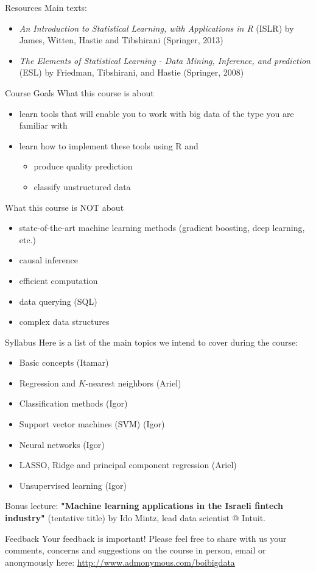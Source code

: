 \documentclass[]{beamer}
\begin{document}
\begin{frame}{Resources}
Main texts:
\begin{itemize}
\item \textit{An Introduction to Statistical Learning, with Applications in R} (ISLR) by James, Witten, Hastie and Tibshirani (Springer, 2013)
\item \textit{The Elements of Statistical Learning - Data Mining, Inference, and prediction} (ESL) by Friedman, Tibshirani, and Hastie (Springer, 2008)
\end{itemize}
\end{frame}

\begin{frame}{Course Goals}
What this course is about
\begin{itemize}
\item learn tools that will enable you to work with big data of the type you are familiar with
\item learn how to implement these tools using R and
\begin{itemize}
\item produce quality prediction
\item classify unstructured data
\end{itemize}
\end{itemize}
What this course is NOT about
\begin{itemize}
\item state-of-the-art machine learning methods (gradient boosting, deep learning, etc.)
\item causal inference
\item efficient computation
\item data querying (SQL)
\item complex data structures
\end{itemize}
\end{frame}

\begin{frame}{Syllabus}
Here is a list of the main topics we intend to cover during the course:
\begin{itemize}
\item Basic concepts (Itamar)
\item Regression and $ K $-nearest neighbors (Ariel)
\item Classification methods (Igor)
\item Support vector machines (SVM) (Igor)
\item Neural networks (Igor)
\item LASSO, Ridge and principal component regression (Ariel)
\item Unsupervised learning (Igor)
\end{itemize}
Bonus lecture: \textbf{"Machine learning applications in the Israeli fintech industry"} (tentative title) by Ido Mintz, lead data scientist @ Intuit.
\end{frame}

\begin{frame}{Feedback}
Your feedback is important! Please feel free to share with us your comments, concerns and suggestions on the course in person, email or anonymously here:
\url{http://www.admonymous.com/boibigdata}
\end{frame}
\end{document}
